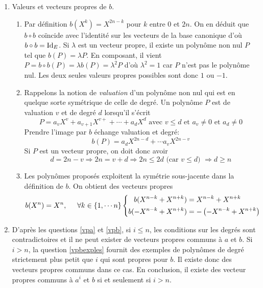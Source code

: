 \begin{enumerate}
\item Valeurs et vecteurs propres de $b$.
\begin{enumerate}
 \item Par définition $b(X^k)=X^{2n-k}$ pour $k$ entre $0$ et $2n$. On en déduit que $b\circ b$ coïncide avec l'identité sur les vecteurs de la base canonique d'où $b\circ b = \operatorname{Id}_E$. Si $\lambda$ est un vecteur propre, il existe un polynôme non nul $P$ tel que $b(P)=\lambda P$. En composant, il vient $P=b\circ b(P) = \lambda b(P) = \lambda^2 P$ d'où $\lambda^2=1$ car $P$ n'est pas le polynôme nul. Les deux seules valeurs propres possibles sont donc $1$ ou $-1$.  
 \item \label{vpb}Rappelons la notion de \emph{valuation} d'un polynôme non nul qui est en quelque sorte symétrique de celle de degré. Un polynôme $P$ est de valuation $v$ et de degré $d$ lorsqu'il s'écrit
\begin{displaymath}
 P = a_vX^v + a_{v+1}X^{v+}+\cdots +a_{d}X^d\text{ avec } v\leq d \text{ et } a_v\neq 0 \text{ et } a_d\neq 0
\end{displaymath}
Prendre l'image par $b$ échange valuation et degré:
\begin{displaymath}
 b(P) = a_{d}X^{2n-d}+\cdots a_vX^{2n-v}
\end{displaymath}
Si $P$ est un vecteur propre, on doit donc avoir
\begin{displaymath}
d = 2n -v \Rightarrow 2n = v+d \Rightarrow 2n \leq 2d \text{ (car $v\leq d$) } \Rightarrow d\geq n 
\end{displaymath}

 \item \label{vpbexples} Les polynômes proposés exploitent la symétrie sous-jacente dans la définition de $b$. On obtient des vecteurs propres
\begin{displaymath}
 b(X^n)=X^n,\hspace{0.5cm}
\forall k\in\{1,\cdots n\}
\left\lbrace 
\begin{aligned}
b(X^{n-k}+X^{n+k}) &= X^{n-k}+X^{n+k} \\
b(-X^{n-k}+X^{n+k}) &= -\left( -X^{n-k}+X^{n+k}\right)  
\end{aligned}
\right. 
\end{displaymath}
\end{enumerate}

\item D'après les questions \ref{vpa} et \ref{vpb}, si $i\leq n$, les conditions sur les degrés sont contradictoires et il ne peut exister de vecteurs propres communs à $a$ et $b$.\newline
Si $i>n$, la question \ref{vpbexples} fournit des exemples de polynômes de degré strictement plus petit que $i$ qui sont propres pour $b$. Il existe donc des vecteurs propres communs dans ce cas.\newline
En conclusion, il existe des vecteur propres communs à $a^i$ et $b$ si et seulement si $i>n$.
\end{enumerate}

